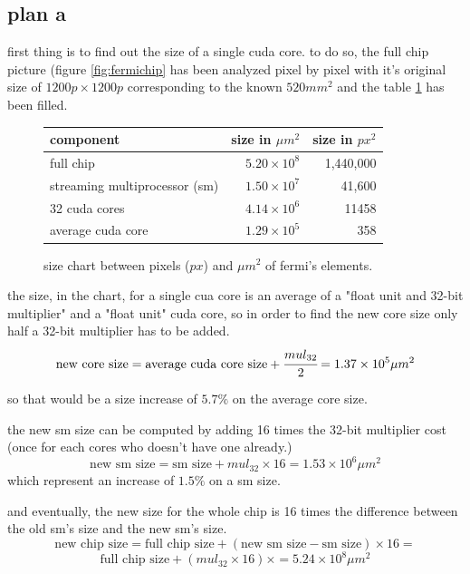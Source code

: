 \documentclass{report}
\begin{document}
   \subsection{plan a}
   first thing is to find out the size of a single cuda core. to do so, the full chip picture (figure \ref{fig:fermichip} has been analyzed pixel by pixel with it's original size of $1200p \times 1200p$ corresponding to
   the known $520mm^2$ and the table \ref{tab:sizechart} has been filled.
   \begin{figure}[h]
    \centering
        \begin{tabular}{ | l | r | r | }
    	    \hline
    	    component & size in $\mu m^2$ & size in $px^2$ \\ \hline
    	    full chip &  $5.20 \times 10^8$ & 1,440,000 \\
            streaming multiprocessor (sm) & $1.50 \times 10^7$ & 41,600 \\
            32 cuda cores & $4.14 \times 10^6$ & 11458 \\
            average cuda core & $1.29 \times 10^5$ &  358 \\ \hline
  	    \end{tabular}
  	\captionsetup{justification=centering}
  	\caption{size chart between pixels ($px$) and $\mu m^2$ of fermi's elements.}
  	\label{tab:sizechart}
    \end{figure}
    
    the size, in the chart, for a single cua core is an average of a "float unit and 32-bit multiplier"
    and a "float unit" cuda core, so in order to find the new core size only half a 32-bit multiplier has to be added.
    \[\text{new core size} = \text{average cuda core size} + \cfrac{mul_{32}}{2} = 1.37 \times 10^5 \mu m^2 \] 
    
    so that would be a size increase of $5.7\%$ on the average core size.
    
    the new sm size can be computed by adding 16 times the 32-bit multiplier cost (once for each cores who doesn't have one already.)
    \[\text{new sm size} = \text{sm size} + mul_{32} \times 16 = 1.53 \times 10^6 \mu m^2 \]
    which represent an increase of $1.5\%$ on a sm size.
    
    and eventually, the new size for the whole chip is 16 times the difference between the old sm's size and the new sm's size.
    \[\text{new chip size} = \text{full chip size} + (\text{new sm size} - \text{sm size}) \times 16 =\]
    \[\text{full chip size} + (mul_{32} \times 16) \times  = 5.24 \times 10^8 \mu m^2 \]
   
\end{document}
